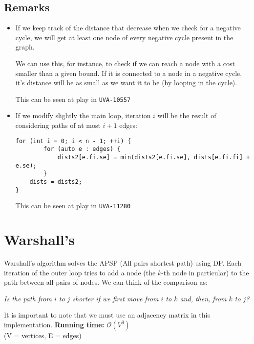 \documentclass[12pt]{report}
\begin{document}
\subsection*{Remarks}
\begin{itemize}
	\item If we keep track of the distance that decrease when we check for
		a negative cycle, we will get at least one node of 
		every negative cycle present in the graph.

		We can use this, for instance, to check if we can reach a node with 
		a cost smaller than a given bound. If it is connected to a node in a 
		negative cycle, it's distance will be as small as we want it to be
		(by looping in the cycle).

		This can be seen at play in \texttt{UVA-10557}
		\newpage
	\item If we modify slightly the main loop, iteration $i$ will be the 
		result of considering paths of at most $i+1$ edges:
		\begin{verbatim}
for (int i = 0; i < n - 1; ++i) {
        for (auto e : edges) {
            dists2[e.fi.se] = min(dists2[e.fi.se], dists[e.fi.fi] + e.se);
        }
	dists = dists2;
}
		\end{verbatim}
		This can be seen at play in \texttt{UVA-11280}
		

\end{itemize}	

\section{Warshall's}
Warshall's algorithm solves the APSP (All pairs shortest path) using DP.
Each iteration of the outer loop tries to add a node (the $k$-th node in
particular) to the path between all pairs of nodes. 
We can think of the comparison as: 
\begin{center}
		\textit{ Is the path from $i$ to $j$ shorter if we first 
		move from $i$ to $k$ and, then, from $k$ to $j$? }
\end{center}
It is important to note that we must use an adjacency matrix in this
implementation.
\noindent \textbf{\boldmath Running time: $\mathcal{O}(V^3)$}
\\ {\small (V = vertices, E = edges)}
\end{document}
